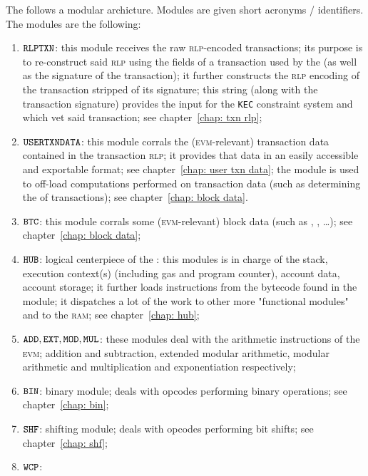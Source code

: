 The \zkEvm{} follows a modular archicture. Modules are given short acronyms / identifiers. The modules are the following:
\begin{enumerate}
	\item $\texttt{RLPTXN}$:
		this module receives the raw \textsc{rlp}-encoded transactions;
		its purpose is to re-construct said \textsc{rlp} using the fields of a transaction used by the \zkEvm{} (as well as the signature of the transaction);
		it further constructs the \textsc{rlp} encoding of the transaction stripped of its signature;
		this string (along with the transaction signature) provides the input for the \texttt{KEC} constraint system and \instEcrecover{} which vet said transaction;
		see chapter~\ref{chap: txn rlp};
	\item $\texttt{USERTXNDATA}{}$:
		this module corrals the (\textsc{evm}-relevant) transaction data contained in the transaction \textsc{rlp};
		it provides that data in an easily accessible and exportable format;
		see chapter~\ref{chap: user txn data};
		\saNote{} the \btcMod{} module is used to off-load computations performed on transaction data (such as determining the  of \cite{EIP-1559} transactions);
			see chapter~\ref{chap: block data}.
	\item $\texttt{BTC}{}$:
		this module corrals some (\textsc{evm}-relevant) block data (such as , , \dots);
			see chapter~\ref{chap: block data};
	\item $\texttt{HUB}{}$:
		logical centerpiece of the \zkEvm{}: this modules is in charge of the stack, execution context(s) (including gas and program counter), account data, account storage;
		it further loads instructions from the bytecode found in the \romMod{} module;
		it dispatches a lot of the work to other more "functional modules" and to the \textsc{ram};
		see chapter~\ref{chap: hub};
	\item $\texttt{ADD}{}, \texttt{EXT}{}, \texttt{MOD}{}, \texttt{MUL}{}$:
		these modules deal with the arithmetic instructions of the \textsc{evm};
		addition and subtraction, extended modular arithmetic, modular arithmetic and multiplication and exponentiation respectively;
	\item $\texttt{BIN}{}$:
		binary module;
		deals with opcodes performing binary operations;
		see chapter~\ref{chap: bin};
	\item $\texttt{SHF}{}$:
		shifting module;
		deals with opcodes performing bit shifts;
		see chapter~\ref{chap: shf};
	\item $\texttt{WCP}{}$:

\end{enumerate}
